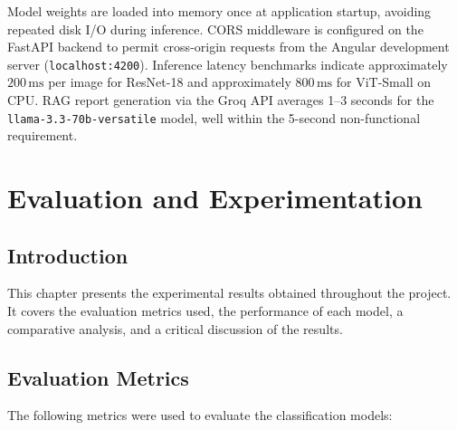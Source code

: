 \documentclass[12pt]{report}
\begin{document}
Model weights are loaded into memory once at application startup, avoiding repeated disk I/O during inference. CORS middleware is configured on the FastAPI backend to permit cross-origin requests from the Angular development server (\texttt{localhost:4200}). Inference latency benchmarks indicate approximately $200\,\text{ms}$ per image for ResNet-18 and approximately $800\,\text{ms}$ for ViT-Small on CPU. RAG report generation via the Groq API averages 1--3 seconds for the \texttt{llama-3.3-70b-versatile} model, well within the 5-second non-functional requirement.

\chapter{Evaluation and Experimentation}

\section{Introduction}
This chapter presents the experimental results obtained throughout the
project. It covers the evaluation metrics used, the performance of each
model, a comparative analysis, and a critical discussion of the results.

\section{Evaluation Metrics}

The following metrics were used to evaluate the classification models:
\end{document}
